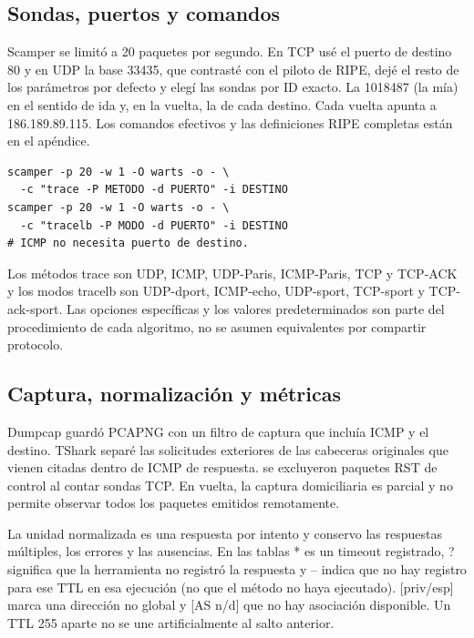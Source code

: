 \subsection{Sondas, puertos y comandos}

Scamper se limitó a 20 paquetes por segundo. En TCP usé el puerto de destino 80 y en UDP la base 33435, que contrasté con el piloto de RIPE, dejé el resto de los parámetros por defecto y elegí las sondas por ID exacto. La 1018487 (la mía) en el sentido de ida y, en la vuelta, la de cada destino. Cada vuelta apunta a 186.189.89.115. Los comandos efectivos y las definiciones RIPE completas están en el apéndice.

\begin{lstlisting}[caption={Forma de los comandos Scamper; los valores efectivos están en cada metadata.json.}]
scamper -p 20 -w 1 -O warts -o - \
  -c "trace -P METODO -d PUERTO" -i DESTINO
scamper -p 20 -w 1 -O warts -o - \
  -c "tracelb -P MODO -d PUERTO" -i DESTINO
# ICMP no necesita puerto de destino.
\end{lstlisting}
Los métodos trace son UDP, ICMP, UDP-Paris, ICMP-Paris, TCP y TCP-ACK y los modos tracelb son UDP-dport, ICMP-echo, UDP-sport, TCP-sport y TCP-ack-sport. Las opciones específicas y los valores predeterminados son parte del procedimiento de cada algoritmo, no se asumen equivalentes por compartir protocolo.

\subsection{Captura, normalización y métricas}
Dumpcap guardó PCAPNG con un filtro de captura que incluía ICMP y el destino. TShark separé las solicitudes exteriores de las cabeceras originales que vienen citadas dentro de ICMP de respuesta. se excluyeron paquetes RST de control al contar sondas TCP. En vuelta, la captura domiciliaria es parcial y no permite observar todos los paquetes emitidos remotamente.

La unidad normalizada es una respuesta por intento y conservo las respuestas múltiples, los errores y las ausencias. En las tablas * es un timeout registrado, ? significa que la herramienta no registró la respuesta y -- indica que no hay registro para ese TTL en esa ejecución (no que el método no haya ejecutado). [priv/esp] marca una dirección no global y [AS n/d] que no hay asociación disponible. Un TTL 255 aparte no se une artificialmente al salto anterior.


